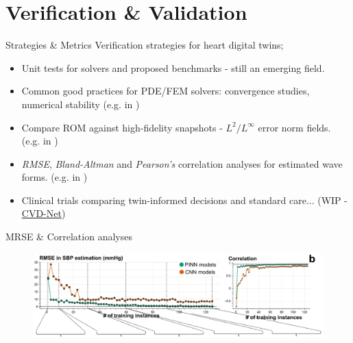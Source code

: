 \documentclass{beamer}
\begin{document}
\section{Verification \& Validation}
\begin{frame}{Strategies \& Metrics}
    Verification strategies for heart digital twins;

    \begin{itemize}
        \item Unit tests for solvers and proposed benchmarks - still an emerging field. \textcite{Reidmen2025}
        \item Common good practices for PDE/FEM solvers: convergence studies, numerical stability (e.g. in \textcite{gerach2021electro})
        \item Compare ROM against high-fidelity snapshots - $L^2/L^\infty$ error norm fields. (e.g. in \textcite{Fresca2021})
        \item \textit{RMSE}, \textit{Bland-Altman} and \textit{Pearson’s} correlation analyses for estimated wave forms. (e.g. in \textcite{jafari2022})
        \item Clinical trials comparing twin-informed decisions and standard care... (WIP - \href{https://www.imperial.ac.uk/news/253154/digital-twin-heart-modelling-project-will/?utm_source}{CVD-Net})
    \end{itemize}
\end{frame}

\begin{frame}{MRSE \& Correlation analyses}
  
  \begin{figure}
      \centering
      \includegraphics[width=1\linewidth]{images/MRSE.png}
      \caption{\textcite{jafari2022}}
  \end{figure}

\end{frame}
\end{document}
